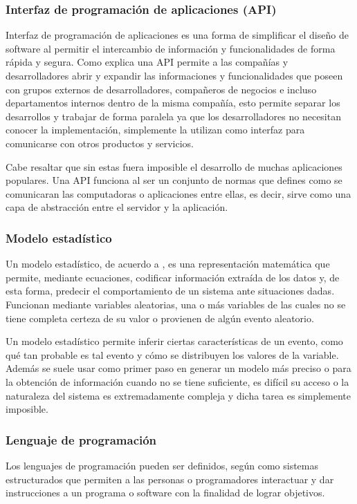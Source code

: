 \subsubsection{Interfaz de programación de aplicaciones (API)}
Interfaz de programación de aplicaciones es una forma de simplificar el diseño
de software al permitir el intercambio de información y funcionalidades de forma
rápida y segura. Como explica \cite{API} una API permite a las compañías y
desarrolladores abrir y expandir las informaciones y funcionalidades que poseen
con grupos externos de desarrolladores, compañeros de negocios e incluso departamentos
internos dentro de la misma compañía, esto permite separar los desarrollos y
trabajar de forma paralela ya que los desarrolladores no necesitan conocer la
implementación, simplemente la utilizan como interfaz para comunicarse con otros
productos y servicios.

Cabe resaltar que sin estas fuera imposible el desarrollo de muchas aplicaciones
populares. Una API funciona al ser un conjunto de normas que defines como se
comunicaran las computadoras o aplicaciones entre ellas, es decir, sirve como
una capa de abstracción entre el servidor y la aplicación.

\subsubsection{Modelo estadístico}

Un modelo estadístico, de acuerdo a \cite{modeloIBM}, es una representación
matemática que permite, mediante
ecuaciones, codificar información extraída de los datos y, de esta forma,
predecir el comportamiento de un sistema ante situaciones dadas. Funcionan
mediante  variables aleatorias, una o más variables de las cuales no
se tiene completa certeza de su valor o provienen de algún evento aleatorio.

Un modelo estadístico permite inferir ciertas características de un evento,
como qué tan probable es tal evento y cómo se distribuyen los valores de la
variable. Además se suele usar como primer paso en generar un modelo más
preciso o para la obtención de información cuando no se tiene suficiente,
es difícil su acceso o la naturaleza del
sistema es extremadamente compleja y dicha tarea es simplemente imposible.


\subsubsection{Lenguaje de programación}
Los lenguajes de programación pueden ser definidos, según \cite{ETAC} como
sistemas estructurados
que permiten a las personas o programadores interactuar y dar instrucciones a un
programa o software con la finalidad de lograr objetivos.

